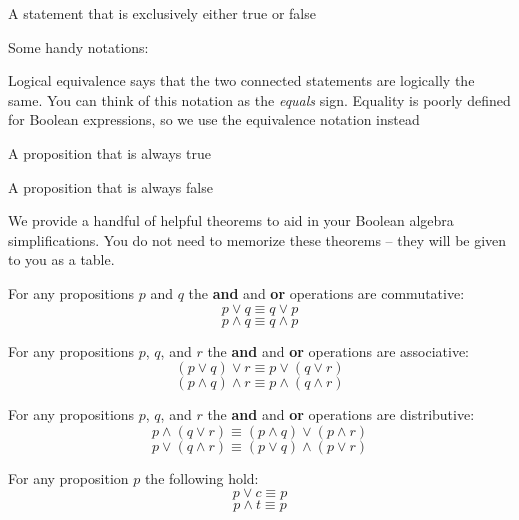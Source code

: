 \documentclass[main.tex]{subfiles}
\begin{document}
\begin{defn}
	A statement that is exclusively either true or false
\end{defn}

Some handy notations:

\begin{defn}
	Logical equivalence says that the two connected statements are logically the same. You can think of this notation as the \textit{equals} sign. Equality is poorly defined for Boolean expressions, so we use the equivalence notation instead
\end{defn}

\begin{defn}
	A proposition that is always true
\end{defn}

\begin{defn}
	A proposition that is always false
\end{defn}

We provide a handful of helpful theorems to aid in your Boolean algebra simplifications. You do not need to memorize these theorems -- they will be given to you as a table.

\begin{thm}[Commutativity]
	For any propositions \(p\) and \(q\) the \textbf{and} and \textbf{or} operations are commutative: \[p \lor q \equiv q \lor p\] \[p \land q \equiv q \land p\]
\end{thm}

\begin{thm}[Associativity]
	For any propositions \(p\), \(q\), and \(r\) the \textbf{and} and \textbf{or} operations are associative: \[(p \lor q) \lor r \equiv p \lor (q \lor r)\] \[(p \land q) \land r \equiv p \land (q \land r)\]
\end{thm}

\begin{thm}[Distributivity]
	For any propositions \(p\), \(q\), and \(r\) the \textbf{and} and \textbf{or} operations are distributive: \[p \land (q \lor r) \equiv (p \land q) \lor (p \land r)\] \[p \lor (q \land r) \equiv (p \lor q) \land (p \lor r)\]
\end{thm}

\begin{thm}[Identity]
	For any proposition \(p\) the following hold: \[p \lor c \equiv p\] \[p \land t \equiv p\]
\end{thm}
\end{document}
